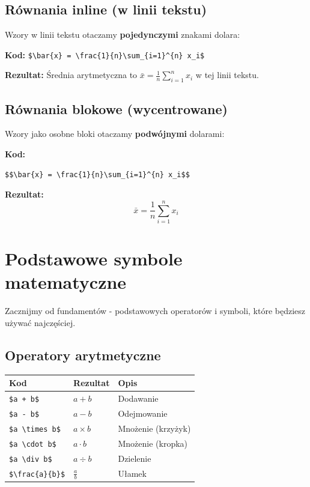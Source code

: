 \documentclass[
  polish,
  letterpaper,
  DIV=11,
  numbers=noendperiod]{scrreprt}
\begin{document}
\subsection{Równania inline (w linii
tekstu)}\label{ruxf3wnania-inline-w-linii-tekstu}

Wzory w linii tekstu otaczamy \textbf{pojedynczymi} znakami dolara:

\textbf{Kod:}
\texttt{\$\textbackslash{}bar\{x\}\ =\ \textbackslash{}frac\{1\}\{n\}\textbackslash{}sum\_\{i=1\}\^{}\{n\}\ x\_i\$}

\textbf{Rezultat:} Średnia arytmetyczna to
\(\bar{x} = \frac{1}{n}\sum_{i=1}^{n} x_i\) w tej linii tekstu.

\subsection{Równania blokowe
(wycentrowane)}\label{ruxf3wnania-blokowe-wycentrowane}

Wzory jako osobne bloki otaczamy \textbf{podwójnymi} dolarami:

\textbf{Kod:}

\begin{verbatim}
$$\bar{x} = \frac{1}{n}\sum_{i=1}^{n} x_i$$
\end{verbatim}

\textbf{Rezultat:} \[\bar{x} = \frac{1}{n}\sum_{i=1}^{n} x_i\]

\section{Podstawowe symbole
matematyczne}\label{podstawowe-symbole-matematyczne}

Zacznijmy od fundamentów - podstawowych operatorów i symboli, które
będziesz używać najczęściej.

\subsection{Operatory arytmetyczne}\label{operatory-arytmetyczne}

\begin{longtable}[]{@{}lll@{}}
\toprule\noalign{}
Kod & Rezultat & Opis \\
\midrule\noalign{}
\endhead
\bottomrule\noalign{}
\endlastfoot
\texttt{\$a\ +\ b\$} & \(a + b\) & Dodawanie \\
\texttt{\$a\ -\ b\$} & \(a - b\) & Odejmowanie \\
\texttt{\$a\ \textbackslash{}times\ b\$} & \(a \times b\) & Mnożenie
(krzyżyk) \\
\texttt{\$a\ \textbackslash{}cdot\ b\$} & \(a \cdot b\) & Mnożenie
(kropka) \\
\texttt{\$a\ \textbackslash{}div\ b\$} & \(a \div b\) & Dzielenie \\
\texttt{\$\textbackslash{}frac\{a\}\{b\}\$} & \(\frac{a}{b}\) &
Ułamek \\
\end{longtable}
\end{document}
